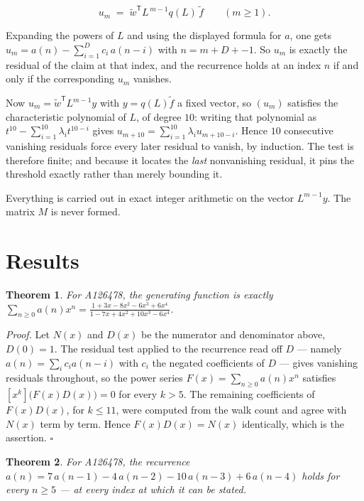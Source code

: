 \documentclass[11pt]{article}
\newtheorem{theorem}{Theorem}
\theoremstyle{definition}
\begin{document}
\[u_m \;=\; \tilde w^{\mathsf T} L^{\,m-1} q(L)\,\tilde f \qquad (m \ge 1).\]

Expanding the powers of $L$ and using the displayed formula for $a$, one gets $u_m = a(n) - \sum_{i=1}^{D} c_i\,a(n-i)$ with $n = m + D + -1$. So $u_m$ is exactly the residual of the claim at that index, and the recurrence holds at an index $n$ if and only if the corresponding $u_m$ vanishes.

Now $u_m = \tilde w^{\mathsf T} L^{m-1} y$ with $y = q(L)\tilde f$ a fixed vector, so $(u_m)$ satisfies the characteristic polynomial of $L$, of degree $10$: writing that polynomial as $t^{10} - \sum_{i=1}^{10} \lambda_i t^{10-i}$ gives $u_{m+10} = \sum_{i=1}^{10} \lambda_i u_{m+10-i}$. Hence $10$ consecutive vanishing residuals force every later residual to vanish, by induction. The test is therefore finite; and because it locates the {\itshape last} nonvanishing residual, it pins the threshold exactly rather than merely bounding it.

Everything is carried out in exact integer arithmetic on the vector $L^{m-1}y$. The matrix $M$ is never formed.

\section{Results}

\begin{theorem} For A126478, the generating function is exactly $\sum_{n\ge 0} a(n)x^n = \frac{1 + 3x - 8x^{2} - 6x^{3} + 6x^{4}}{1 - 7x + 4x^{2} + 10x^{3} - 6x^{4}}$.\end{theorem}

{\itshape Proof.} Let $N(x)$ and $D(x)$ be the numerator and denominator above, $D(0)=1$. The residual test applied to the recurrence read off $D$ --- namely $a(n) = \sum_i c_i a(n-i)$ with $c_i$ the negated coefficients of $D$ --- gives vanishing residuals throughout, so the power series $F(x)=\sum_{n\ge 0}a(n)x^n$ satisfies $[x^k]\bigl(F(x)D(x)\bigr) = 0$ for every $k > 5$. The remaining coefficients of $F(x)D(x)$, for $k \le 11$, were computed from the walk count and agree with $N(x)$ term by term. Hence $F(x)D(x) = N(x)$ identically, which is the assertion. $\square$

\begin{theorem} For A126478, the recurrence $a(n) = 7\,a(n-1) - 4\,a(n-2) - 10\,a(n-3) + 6\,a(n-4)$ holds for every $n \ge 5$ --- at every index at which it can be stated.\end{theorem}
\end{document}
